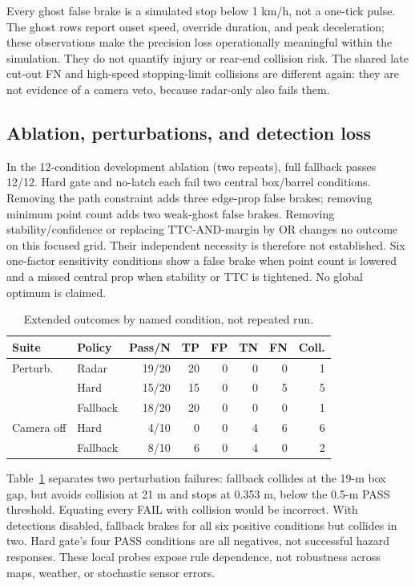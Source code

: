 \documentclass[conference]{IEEEtran}
\begin{document}
Every ghost false brake is a simulated stop below 1 km/h, not a one-tick pulse.
The ghost rows report onset speed, override duration, and peak deceleration;
these observations make the precision loss operationally meaningful within the
simulation. They do not quantify injury or rear-end collision risk. The shared
late cut-out FN and high-speed stopping-limit collisions are different again:
they are not evidence of a camera veto, because radar-only also fails them.

\subsection{Ablation, perturbations, and detection loss}
In the 12-condition development ablation (two repeats), full fallback passes
12/12. Hard gate and no-latch each fail two central box/barrel conditions.
Removing the path constraint adds three edge-prop false brakes; removing minimum
point count adds two weak-ghost false brakes. Removing stability/confidence or
replacing TTC-AND-margin by OR changes no outcome on this focused grid. Their
independent necessity is therefore not established. Six one-factor sensitivity
conditions show a false brake when point count is lowered and a missed central
prop when stability or TTC is tightened. No global optimum is claimed.

\begin{table}[t]
\caption{Extended outcomes by named condition, not repeated run.}
\label{tab:extended}
\centering\scriptsize
\setlength{\tabcolsep}{3pt}
\begin{tabular}{llrrrrrr}
\toprule Suite & Policy & Pass/N & TP & FP & TN & FN & Coll.\\ \midrule
Perturb. & Radar & 19/20 & 20 & 0 & 0 & 0 & 1\\
 & Hard & 15/20 & 15 & 0 & 0 & 5 & 5\\
 & Fallback & 18/20 & 20 & 0 & 0 & 0 & 1\\
\midrule
Camera off & Hard & 4/10 & 0 & 0 & 4 & 6 & 6\\
 & Fallback & 8/10 & 6 & 0 & 4 & 0 & 2\\
\bottomrule
\end{tabular}
\end{table}

Table~\ref{tab:extended} separates two perturbation failures: fallback collides
at the 19-m box gap, but avoids collision at 21 m and stops at 0.353 m, below
the 0.5-m PASS threshold. Equating every FAIL with collision would be incorrect.
With detections disabled, fallback brakes for all six positive conditions but
collides in two. Hard gate's four PASS conditions are all negatives, not
successful hazard responses. These local probes expose rule dependence, not
robustness across maps, weather, or stochastic sensor errors.
\end{document}
